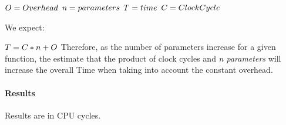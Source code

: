 $ O = Overhead \\ $
$ n = parameters \\$
$ T = time \\$
$ C = Clock Cycle \\$

We expect:

$T = C * n + O \\$
\hspace{.1cm}
Therefore, as the number of parameters increase for a given function, the estimate that the product of clock cycles and \emph{n parameters} will increase the overall Time when taking into account the constant overhead.

\paragraph{Results}
Results are in CPU cycles.
